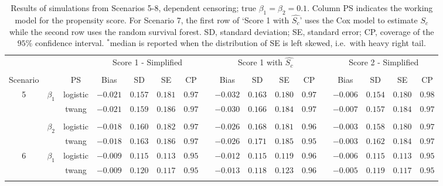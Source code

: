 \documentclass[11pt]{article}
\begin{document}
\begin{table}[h]
\caption{Results of simulations from Scenarios 5-8, dependent censoring; true $\beta_1= \beta_2 =0.1$. 
Column PS indicates the working model for the propensity score. For Scenario 7, the first row of `Score 1 with $\hat{S_c}$' uses the Cox model to estimate $S_c$ while the second row uses the random survival forest. SD, standard deviation; SE, standard error; CP, coverage of the $95\%$ confidence interval. $^*$median is reported when the distribution of SE is left skewed, i.e.~with heavy right tail.}\label{res2}
\footnotesize
\begin{center}
\setlength{\tabcolsep}{4.5pt}
\begin{tabular}{ccc rrrr c rrlc c rrrr}

\hline\hline
\multicolumn{2}{l}{} & & \multicolumn{4}{c}{Score 1 - Simplified} &&  \multicolumn{4}{c}{Score 1 with $\hat{S_c}$} &&  \multicolumn{4}{c}{Score 2 - Simplified}\tabularnewline %
\cline{4-7}\cline{9-12}\cline{14-17}
\\[-1.5ex] 
Scenario && PS&\multicolumn{1}{c}{Bias}&\multicolumn{1}{c}{SD}&\multicolumn{1}{c}{SE}&\multicolumn{1}{c}{CP}&&\multicolumn{1}{c}{Bias}&\multicolumn{1}{c}{SD}&\multicolumn{1}{c}{SE}&\multicolumn{1}{c}{CP}&&\multicolumn{1}{c}{Bias}&\multicolumn{1}{c}{SD}&\multicolumn{1}{c}{SE}&\multicolumn{1}{c}{CP}
\tabularnewline\hline
\hline
\multirow{4}{*}{5}&\multirow{2}{*}{$\beta_1$}& logistic  &$-0.021$&$0.157$&$0.181$&$0.97$&&$-0.032$&$0.163$&$0.180$&$0.97$&&$-0.006$&$0.154$&$0.180$&$0.98$\tabularnewline

&&twang 
&$-0.021$&$0.159$&$0.186$&$0.97$&&$-0.030$&$0.166$&$0.184$&$0.97$&&$-0.007$&$0.157$&$0.184$&$0.97$\tabularnewline
 \\[-1.5ex] 

&\multirow{2}{*}{$\beta_2$}& logistic 
&$-0.018$&$0.160$&$0.182$&$0.97$&&$-0.026$&$0.168$&$0.181$&$0.96$&&$-0.003$&$0.158$&$0.180$&$0.97$\tabularnewline

&&twang &$-0.018$&$0.163$&$0.186$&$0.97$&&$-0.026$&$0.171$&$0.185$&$0.95$&&$-0.003$&$0.162$&$0.184$&$0.97$\tabularnewline
\hline
\multirow{4}{*}{6}&\multirow{2}{*}{$\beta_1$}&logistic &$-0.009$&$0.115$&$0.113$&$0.95$&&$-0.012$&$0.115$&$0.119$&$0.96$&&$ -0.006$&$0.115$&$0.113$&$0.95$\tabularnewline

&&twang 
&$-0.009$&$0.120$&$0.117$&$0.95$&&$-0.013$&$0.118$&$0.123$&$0.96$&&$-0.005$&$0.119$&$0.117$&$0.95$\tabularnewline
 \\[-1.5ex] 


\end{tabular}
\end{center}
\end{table}
\end{document}
